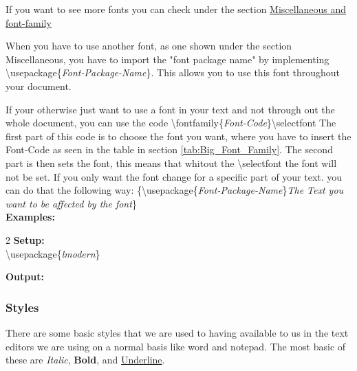 \documentclass{article}
\newcommand{\bs}[1]{\textbackslash{}#1} %
\begin{document}
If you want to see more fonts you can check under the section \hyperref[secc:font-family-sheet]{Miscellaneous and font-family}

When you have to use another font, as one shown under the section Miscellaneous, you have to import the "font package name" by implementing \bs{usepackage\{\textit{Font-Package-Name}\}}.
This allows you to use this font throughout your document.

If your otherwise just want to use a font in your text and not through out the whole document, you can use the code \bs{fontfamily\{\textit{Font-Code}\}}\bs{selectfont}
The first part of this code is to choose the font you want, where you have to insert the Font-Code as seen in the table in section \ref{tab:Big_Font_Family}.
The second part is then sets the font, this means that whitout the \bs{selectfont} the font will not be set. If you only want the font change for a specific part
of your text. you can do that the following way: \{\bs{usepackage\{\textit{Font-Package-Name}\}}\textit{The Text you want to be affected by the font}\} \\

{\large\textbf{Examples:}}
\begin{multicols}{2}
    \noindent
    \vspace{0.5em}
    \textbf{Setup:} \\
    \bs{usepackage}\{\textit{lmodern}\}
    \vspace{1em}

    \noindent
    \vspace{0.5em}
    \textbf{Output:} \\
    \vspace{1em}

\end{multicols}

\subsubsection{Styles}\label{subsubsec:text_styles}
There are some basic styles that we are used to having available to us in the text editors we are using on a normal basis like word and notepad.
The most basic of these are \textit{Italic}, \textbf{Bold}, and \underline{Underline}. 
\end{document}
